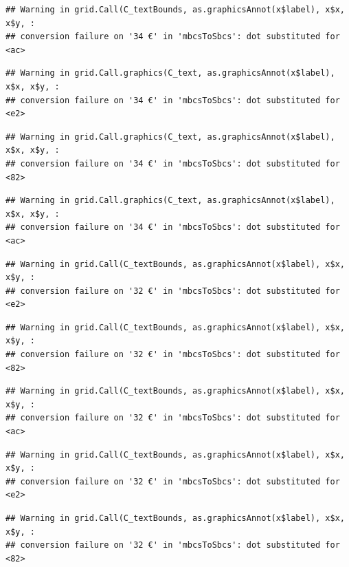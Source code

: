 \documentclass[
]{article}
\begin{document}
\begin{verbatim}
## Warning in grid.Call(C_textBounds, as.graphicsAnnot(x$label), x$x, x$y, :
## conversion failure on '34 €' in 'mbcsToSbcs': dot substituted for <ac>
\end{verbatim}

\begin{verbatim}
## Warning in grid.Call.graphics(C_text, as.graphicsAnnot(x$label), x$x, x$y, :
## conversion failure on '34 €' in 'mbcsToSbcs': dot substituted for <e2>
\end{verbatim}

\begin{verbatim}
## Warning in grid.Call.graphics(C_text, as.graphicsAnnot(x$label), x$x, x$y, :
## conversion failure on '34 €' in 'mbcsToSbcs': dot substituted for <82>
\end{verbatim}

\begin{verbatim}
## Warning in grid.Call.graphics(C_text, as.graphicsAnnot(x$label), x$x, x$y, :
## conversion failure on '34 €' in 'mbcsToSbcs': dot substituted for <ac>
\end{verbatim}

\begin{verbatim}
## Warning in grid.Call(C_textBounds, as.graphicsAnnot(x$label), x$x, x$y, :
## conversion failure on '32 €' in 'mbcsToSbcs': dot substituted for <e2>
\end{verbatim}

\begin{verbatim}
## Warning in grid.Call(C_textBounds, as.graphicsAnnot(x$label), x$x, x$y, :
## conversion failure on '32 €' in 'mbcsToSbcs': dot substituted for <82>
\end{verbatim}

\begin{verbatim}
## Warning in grid.Call(C_textBounds, as.graphicsAnnot(x$label), x$x, x$y, :
## conversion failure on '32 €' in 'mbcsToSbcs': dot substituted for <ac>
\end{verbatim}

\begin{verbatim}
## Warning in grid.Call(C_textBounds, as.graphicsAnnot(x$label), x$x, x$y, :
## conversion failure on '32 €' in 'mbcsToSbcs': dot substituted for <e2>
\end{verbatim}

\begin{verbatim}
## Warning in grid.Call(C_textBounds, as.graphicsAnnot(x$label), x$x, x$y, :
## conversion failure on '32 €' in 'mbcsToSbcs': dot substituted for <82>
\end{verbatim}
\end{document}
